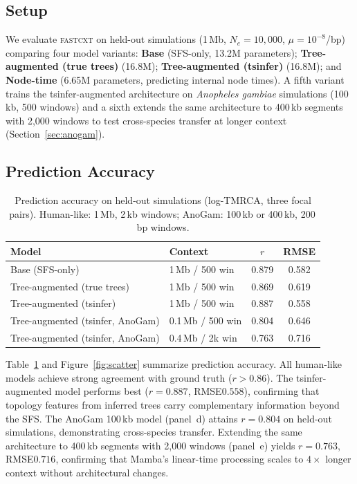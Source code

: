 \documentclass{article}
\begin{document}
\subsection{Setup}

We evaluate \textsc{fastcxt} on held-out simulations (1\,Mb, $N_e = 10{,}000$,
$\mu = 10^{-8}$/bp) comparing four model variants: \textbf{Base} (SFS-only, 13.2M
parameters); \textbf{Tree-augmented (true trees)} (16.8M); \textbf{Tree-augmented (tsinfer)}
(16.8M); and \textbf{Node-time} (6.65M parameters, predicting internal node times).
A fifth variant trains the tsinfer-augmented architecture on \emph{Anopheles gambiae}
simulations (100\,kb, 500 windows) and a sixth extends the same architecture to 400\,kb
segments with 2{,}000 windows to test cross-species transfer at longer context
(Section~\ref{sec:anogam}).

\subsection{Prediction Accuracy}

\begin{table}[t]
\caption{Prediction accuracy on held-out simulations (log-TMRCA, three focal pairs).
Human-like: 1\,Mb, 2\,kb windows; AnoGam: 100\,kb or 400\,kb, 200\,bp windows.}
\label{tab:accuracy}
\centering
\begin{tabular}{llcc}
\toprule
\textbf{Model} & \textbf{Context} & $r$ & \textbf{RMSE} \\
\midrule
Base (SFS-only)             & 1\,Mb / 500 win  & 0.879 & 0.582 \\
Tree-augmented (true trees) & 1\,Mb / 500 win  & 0.869 & 0.619 \\
Tree-augmented (tsinfer)    & 1\,Mb / 500 win  & 0.887 & 0.558 \\
Tree-augmented (tsinfer, AnoGam) & 0.1\,Mb / 500 win & 0.804 & 0.646 \\
Tree-augmented (tsinfer, AnoGam) & 0.4\,Mb / 2k win  & 0.763 & 0.716 \\
\bottomrule
\end{tabular}
\end{table}

Table~\ref{tab:accuracy} and Figure~\ref{fig:scatter} summarize prediction accuracy. All
human-like models achieve strong agreement with ground truth ($r > 0.86$). The tsinfer-augmented model
performs best ($r = 0.887$, RMSE\;$0.558$), confirming that topology features from inferred
trees carry complementary information beyond the SFS. The AnoGam 100\,kb model (panel~d) attains
$r = 0.804$ on held-out simulations, demonstrating cross-species transfer. Extending the same
architecture to 400\,kb segments with 2{,}000 windows (panel~e) yields $r = 0.763$,
RMSE\;$0.716$, confirming that Mamba's linear-time processing scales to $4\times$ longer
context without architectural changes.
\end{document}
